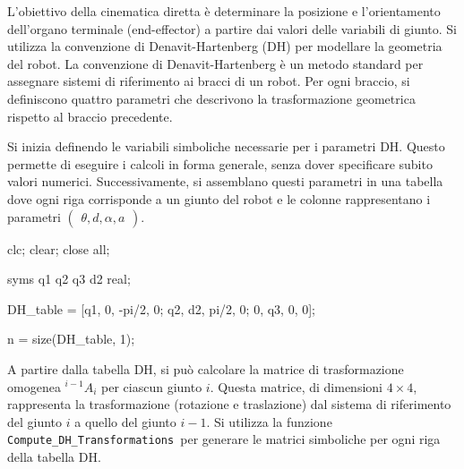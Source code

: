 \documentclass[11pt, a4paper]{article}
\begin{document}

\begin{par}
\begin{flushleft}
L'obiettivo della cinematica diretta è determinare la posizione e l'orientamento dell'organo terminale (end-effector) a partire dai valori delle variabili di giunto. Si utilizza la convenzione di Denavit-Hartenberg (DH) per modellare la geometria del robot. La convenzione di Denavit-Hartenberg è un metodo standard per assegnare sistemi di riferimento ai bracci di un robot. Per ogni braccio, si definiscono quattro parametri che descrivono la trasformazione geometrica rispetto al braccio precedente.
\end{flushleft}
\end{par}

\begin{par}
\begin{flushleft}
Si inizia definendo le variabili simboliche necessarie per i parametri DH. Questo permette di eseguire i calcoli in forma generale, senza dover specificare subito valori numerici. Successivamente, si assemblano questi parametri in una tabella dove ogni riga corrisponde a un giunto del robot e le colonne rappresentano i parametri $\left(\begin{array}{c}
\theta ,d,\alpha ,a
\end{array}\right)$.
\end{flushleft}
\end{par}

\begin{matlabcode}
clc; clear; close all;

syms q1 q2 q3 d2 real;

DH_table = [q1, 0, -pi/2, 0;
            q2, d2, pi/2, 0;
            0, q3, 0, 0];


n = size(DH_table, 1);
\end{matlabcode}

\begin{par}
\begin{flushleft}
A partire dalla tabella DH, si può calcolare la matrice di trasformazione omogenea $^{i-1}A_i$ per ciascun giunto $i$. Questa matrice, di dimensioni $4\times 4$, rappresenta la trasformazione (rotazione e traslazione) dal sistema di riferimento del giunto $i$ a quello del giunto $i-1$. Si utilizza la funzione \texttt{Compute\_DH\_Transformations }per generare le matrici simboliche per ogni riga della tabella DH.
\end{flushleft}
\end{par}
\end{document}
